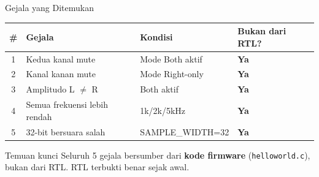 \documentclass[aspectratio=169]{beamer}
\newcommand{\good}[1]{\textcolor{green!60!black}{\textbf{#1}}}
\begin{document}
\begin{frame}{Gejala yang Ditemukan}
  \begin{center}
  \small
  \begin{tabular}{clll}
    \toprule
    \# & Gejala & Kondisi & Bukan dari RTL? \\
    \midrule
    1 & Kedua kanal mute & Mode Both aktif & \good{Ya} \\
    2 & Kanal kanan mute & Mode Right-only & \good{Ya} \\
    3 & Amplitudo L $\neq$ R & Both aktif & \good{Ya} \\
    4 & Semua frekuensi lebih rendah & 1k/2k/5kHz & \good{Ya} \\
    5 & 32-bit bersuara salah & SAMPLE\_WIDTH=32 & \good{Ya} \\
    \bottomrule
  \end{tabular}
  \end{center}

  \vspace{0.5em}
  \begin{alertblock}{Temuan kunci}
    Seluruh 5 gejala bersumber dari \textbf{kode firmware} (\texttt{helloworld.c}),
    bukan dari RTL. RTL terbukti benar sejak awal.
  \end{alertblock}
\end{frame}
\end{document}
